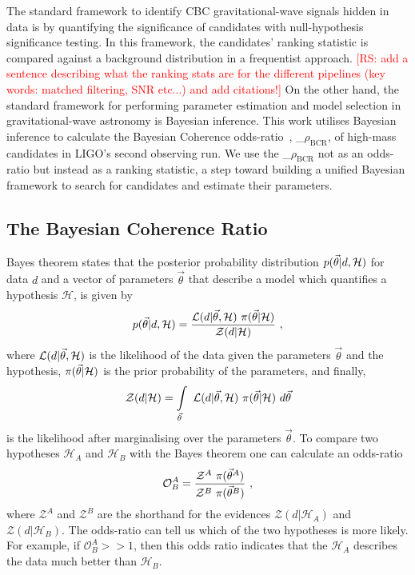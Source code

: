 \documentclass[%
 nofootinbib,
 amsmath,amssymb,
 aps,
 twocolumn
]{revtex4-2}
\newcommand{\mathcmd}[1]{{\sc \relax\ifmmode#1\else $#1$\fi}\xspace}
\newcommand{\bcr}{\mathcmd{\rho_\text{BCR}}}
\newcommand{\parameters}{\mathcmd{\vec{\theta}}}
\newcommand{\rs}[1]{\textcolor{red}{[RS: #1]}}
\begin{document}
The standard framework to identify CBC gravitational-wave signals hidden in data is by quantifying the significance of candidates with null-hypothesis significance testing. In this framework, the candidates' ranking statistic is compared against a background distribution in a frequentist approach. \rs{add a sentence describing what the ranking stats are for the different pipelines (key words: matched filtering, SNR etc...) and add citations!} On the other hand, the standard framework for performing parameter estimation and model selection in gravitational-wave astronomy is Bayesian inference. This work utilises Bayesian inference to calculate the Bayesian Coherence odds-ratio~\cite{BCR1}, \bcr, of high-mass candidates in LIGO's second observing run. We use the \bcr not as an odds-ratio but instead as a ranking statistic, a step toward building a unified Bayesian framework to search for candidates and estimate their parameters.

\subsection{The Bayesian Coherence Ratio}

Bayes theorem states that the posterior probability distribution $p(\parameters|d,\mathcal{H})$ for data $d$ and a vector of parameters \parameters that describe a model which quantifies a hypothesis $\mathcal{H}$, is given by
\begin{equation}
p(\parameters|d,\mathcal{H}) = \frac{\mathcal{L}(d|\parameters, \mathcal{H}) \ \pi(\parameters | \mathcal{H})}{\mathcal{Z}(d|\mathcal{H})}\ , 
\end{equation}
where $\mathcal{L}(d|\parameters, \mathcal{H})$ is the likelihood of the data given the parameters \parameters and the hypothesis, $\pi(\parameters | \mathcal{H})$ is the prior probability of the parameters, and finally,
\begin{equation}
    \mathcal{Z}(d|\mathcal{H}) = \int\limits_{\parameters} \ \mathcal{L}(d|\parameters,\mathcal{H}) \ \pi(\parameters | \mathcal{H}) \ d\parameters
\end{equation} is the likelihood after marginalising over the parameters \parameters.  To compare two hypotheses $\mathcal{H}_A$ and $\mathcal{H}_B$ with the Bayes theorem one can calculate an odds-ratio
\begin{equation}
    \mathcal{O}^A_B = \frac{\mathcal{Z}^A\ \pi(\parameters^A)}{\mathcal{Z}^B\ \pi(\parameters^B)}\ ,
\end{equation}
where $\mathcal{Z}^A$ and $\mathcal{Z}^B$ are the shorthand for the evidences  $\mathcal{Z}(d|\mathcal{H}_A)$ and $\mathcal{Z}(d|\mathcal{H}_B)$. The odds-ratio can tell us which of the two hypotheses is more likely. For example, if $\mathcal{O}^A_B >> 1$, then this odds ratio indicates that the $\mathcal{H}_A$ describes the data much better than $\mathcal{H}_B$. 
\end{document}
